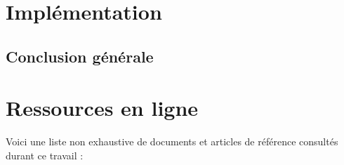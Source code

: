 \documentclass[12pt,a4paper]{report}
\begin{document}
\chapter{Implémentation}


\section*{Conclusion générale}


\chapter*{Ressources en ligne}
Voici une liste non exhaustive de documents et articles de référence consultés durant ce travail :
\end{document}
